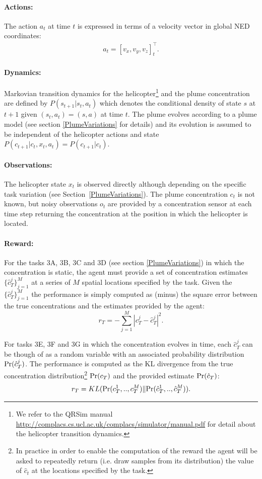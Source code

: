 \documentclass[a4paper,11pt]{report}
\newcommand{\sname}{QRSim\xspace}
\newcommand{\webman}{\url{http://complacs.cs.ucl.ac.uk/complacs/simulator/manual.pdf}\xspace}
\newcommand{\pr}{{\rm Pr}}
\begin{document}
\paragraph{Actions:}
The action $a_t$ at time $t$ is expressed in terms of a velocity vector in global NED coordinates:
\begin{align}
a_t=[v_x,v_y,v_z]_t^\intercal.
\end{align}

\paragraph{Dynamics:} Markovian transition dynamics for the helicopter\footnote{We refer to the \sname manual \webman for detail about the helicopter transition dynamics.} and the plume concentration are defined by $P(s_{t+1}|s_t,a_t)$ which denotes the conditional density of state $s$ at $t+1$ given $(s_t,a_t) = (s,a)$ at time $t$. The plume evolves according to a plume model (see section \ref{PlumeVariations} for details) and its evolution is assumed to be independent of the helicopter actions and state  $P(c_{t+1}|c_t,x_t,a_t)=P(c_{t+1}|c_t)$.

\paragraph{Observations:} The helicopter state $x_t$ is observed directly although depending on the specific task variation (see Section~\ref{PlumeVariations}). 
The plume concentration $c_t$ is not known, but noisy observations $o_t$ are provided by a concentration sensor at each time step returning the concentration at the position in which the helicopter is located.

\paragraph{Reward:} 
For the tasks 3A, 3B, 3C and 3D (see section \ref{PlumeVariations}) in which the concentration is static, the agent must provide a set of concentration estimates $\{\hat c^j_T\}^M_{j=1}$ at a series of $M$ spatial locations specified by the task. 
Given the $\{\hat c^j_T\}^M_{j=1}$ the performance is simply computed as (minus) the square error between the true concentrations and the estimates provided by the agent:
$$
r_T = - \sum^M_{j=1} | c^j_T - \hat{c}^j_T |^2 .
$$

For tasks 3E, 3F and 3G in which the concentration evolves in time, each $\hat c^j_T$ can be though of as a random variable with an associated probability distribution $\pr(\hat c^j_T)$.
The performance is computed as the KL divergence from the true concentration distribution\footnote{In practice in order to enable the computation of the reward the agent will be asked to repeatedly return (i.e. draw samples from its distribution) the value of $\hat c_t$ at the locations specified by the task.} $\pr(c_T)$ and the provided estimate $\pr(\hat c_T)$:
$$
r_T = KL(\pr(c^1_T,..,c^M_T) \|{\pr}(\hat c^1_T,..,\hat c^M_T)).
$$
\end{document}
